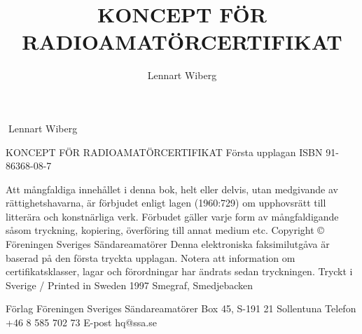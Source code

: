 \documentclass[a4paper,twoside,twocolumn,openright]{book}
\begin{document}
\frontmatter
\title{KONCEPT FÖR RADIOAMATÖRCERTIFIKAT}
\author{Lennart Wiberg}
\maketitle

Lennart Wiberg

KONCEPT FÖR RADIOAMATÖRCERTIFIKAT
Första upplagan
ISBN 91-86368-08-7

Att mångfaldiga innehållet i denna bok, helt eller delvis, utan medgivande av
rättighetshavarna, är förbjudet enligt lagen (1960:729) om upphovsrätt till
litterära och konstnärliga verk. Förbudet gäller varje form av mångfaldigande
såsom tryckning, kopiering, överföring till annat medium etc.
Copyright © Föreningen Sveriges Sändareamatörer
Denna elektroniska faksimilutgåva är baserad på den första tryckta
upplagan. Notera att information om certifikatsklasser, lagar och
förordningar har ändrats sedan tryckningen.
Tryckt i Sverige / Printed in Sweden 1997
Smegraf, Smedjebacken


Förlag
Föreningen Sveriges Sändareamatörer
Box 45, S-191 21 Sollentuna
Telefon +46 8 585 702 73
E-post hq@ssa.se


\tableofcontents

\mainmatter



























\appendix












\listoffigures
\listoftables

\backmatter

\printindex
\end{document}
